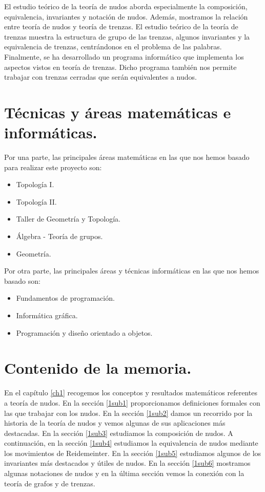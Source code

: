 El estudio teórico de la teoría de nudos aborda especialmente la composición, equivalencia, invariantes y notación de nudos. Además, mostramos la relación entre teoría de nudos y teoría de trenzas. El estudio teórico de la teoría de trenzas muestra la estructura de grupo de las trenzas, algunos invariantes y la equivalencia de trenzas, centrándonos en el problema de las palabras. \\

Finalmente, se ha desarrollado un programa informático que implementa los aspectos vistos en teoría de trenzas. Dicho programa también nos permite trabajar con trenzas cerradas que serán equivalentes a nudos. \\

\section{Técnicas y áreas matemáticas e informáticas.}
Por una parte, las principales áreas matemáticas en las que nos hemos basado para realizar este proyecto son:
\begin{itemize}
	\item Topología I.
	\item Topología II.
	\item Taller de Geometría y Topología.
	\item Álgebra - Teoría de grupos. 
	\item Geometría.
\end{itemize}
Por otra parte, las principales áreas y técnicas informáticas en las que nos hemos basado son:
\begin{itemize}
	\item Fundamentos de programación.
	\item Informática gráfica.
	\item Programación y diseño orientado a objetos. 
\end{itemize}

\section{Contenido de la memoria.}
En el capítulo \ref{ch1} recogemos los conceptos y resultados matemáticos referentes a teoría de nudos. En la sección \ref{1sub1} proporcionamos definiciones formales con las que trabajar con los nudos. En la sección \ref{1sub2} damos un recorrido por la historia de la teoría de nudos y vemos algunas de sus aplicaciones más destacadas. En la sección \ref{1sub3} estudiamos la composición de nudos. A continuación, en la sección \ref{1sub4} estudiamos la equivalencia de nudos mediante los movimientos de Reidemeinter. En la sección \ref{1sub5} estudiamos algunos de los invariantes más destacados y útiles de nudos. En la sección \ref{1sub6} mostramos algunas notaciones de nudos y en la última sección vemos la conexión con la teoría de grafos y de trenzas.\\

